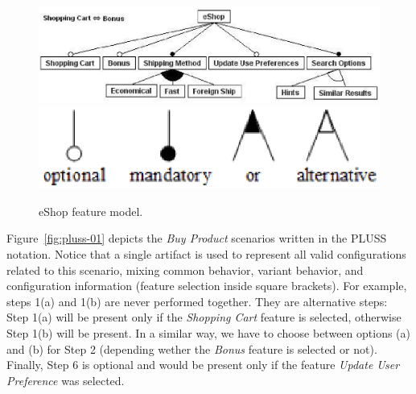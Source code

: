  \begin{figure}[th]
 \begin{center}
  \includegraphics[scale=0.45]{img/eShop-FM.eps}
   \includegraphics[scale=0.40]{img/fm-notation.eps}
  \caption{eShop feature model.}
  \label{fig:eshop-fm}
  \end{center}
\end{figure}




Figure~\ref{fig:pluss-01} depicts the \emph{Buy Product} scenarios written in
the PLUSS notation. Notice that a single artifact is used to represent all valid
configurations related to this scenario, mixing common behavior, variant
behavior, and configuration information (feature selection inside square
brackets). For example, steps 1(a) and 1(b) are never performed together. They
are alternative steps: Step 1(a) will be present only if the \emph{Shopping
Cart} feature is selected, otherwise Step 1(b) will be present. In a similar
way, we have to choose between options (a) and (b) for Step 2 (depending wether
the \emph{Bonus} feature is selected or not). Finally, Step 6 is optional and
would be present only if the feature \emph{Update User Preference} was selected.

